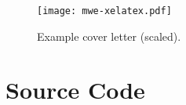 \documentclass{ltxdoc}
\begin{document}
  \begin{figure}[!ht]
    \texttt{[image: mwe-xelatex.pdf]}
    \caption{Example cover letter (scaled).}
    \label{example-cover-letter}
  \end{figure}

  

\section{Source Code}



\PrintIndex
\end{document}
